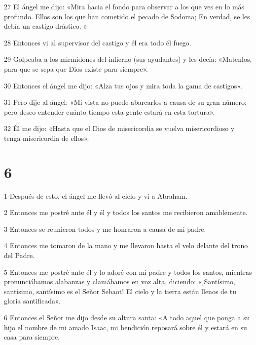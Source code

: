 \par 27 El ángel me dijo: «Mira hacia el fondo para observar a los que ves en lo más profundo. Ellos son los que han cometido el pecado de Sodoma; En verdad, se les debía un castigo drástico. »

\par 28 Entonces vi al supervisor del castigo y él era todo él fuego.

\par 29 Golpeaba a los mirmidones del infierno (sus ayudantes) y les decía: «Matenlos, para que se sepa que Dios existe para siempre».

\par 30 Entonces el ángel me dijo: «Alza tus ojos y mira toda la gama de castigos».

\par 31 Pero dije al ángel: «Mi vista no puede abarcarlos a causa de su gran número; pero deseo entender cuánto tiempo esta gente estará en esta tortura».

\par 32 Él me dijo: «Hasta que el Dios de misericordia se vuelva misericordioso y tenga misericordia de ellos».

\chapter{6}

\par 1 Después de esto, el ángel me llevó al cielo y vi a Abraham.

\par 2 Entonces me postré ante él y él y todos los santos me recibieron amablemente.

\par 3 Entonces se reunieron todos y me honraron a causa de mi padre.

\par 4 Entonces me tomaron de la mano y me llevaron hasta el velo delante del trono del Padre.

\par 5 Entonces me postré ante él y lo adoré con mi padre y todos los santos, mientras pronunciábamos alabanzas y clamábamos en voz alta, diciendo: «¡Santísimo, santísimo, santísimo es el Señor Sebaot! El cielo y la tierra están llenos de tu gloria santificada».

\par 6 Entonces el Señor me dijo desde su altura santa: «A todo aquel que ponga a su hijo el nombre de mi amado Isaac, mi bendición reposará sobre él y estará en su casa para siempre.

